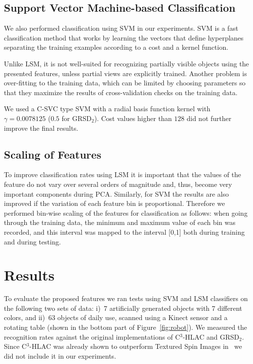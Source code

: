 \documentclass[a4paper, 10 pt, conference]{sty/ieeeconf}
\begin{document}
\subsection{Support Vector Machine-based Classification}
We also performed classification using SVM in our experiments.
SVM is a fast classification method that works by learning the vectors that define hyperplanes separating
the training examples according to a cost and a kernel function.

Unlike LSM, it is not well-suited for recognizing partially visible objects using the presented features,
unless partial views are explicitly trained. Another problem is over-fitting to the training data, which
can be limited by choosing parameters so that they maximize the results of cross-validation checks
on the training data.

We used a C-SVC type SVM with a radial basis function kernel \cite{LIBSVM} with $\gamma = 0.0078125$
($0.5$ for GRSD$_2$). Cost values higher than $128$ did not further improve the final results.

\subsection{Scaling of Features}
To improve classification rates using LSM it is important 
that the values of the feature do not vary over several orders of magnitude and, thus, become very important components during PCA.
Similarly, for SVM the results are also improved if the variation of each feature bin is
proportional. Therefore we performed bin-wise scaling of the features for classification as follows: 
when going through the training data, the minimum and maximum value of each bin was recorded, and this interval 
was mapped to the interval [0,1] both during training and during testing.


\section{Results}
\label{sec:results}
To evaluate the proposed features we ran
tests using SVM and LSM classifiers on the following two sets of data: 
i)~7 artificially generated objects with 7 different colors, and
ii)~63 objects of daily use, scanned using a Kinect sensor and a rotating table
(shown in the bottom part of Figure~\ref{fig:robot}). 
We measured the recognition rates against the original implementations of C$^3$-HLAC and 
GRSD$_2$.
Since C$^3$-HLAC was already shown to outperform Textured Spin Images in~\cite{kanezaki2010icra}
we did not include it in our experiments.
\end{document}
